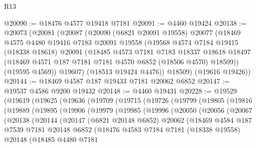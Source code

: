 \begin{lexlean}{R13}
\begin{coremodule}
@20090 := @18476 @4577 @19418 @7181
@20091 := @4460 @19424
@20138 := @20073
    (@20081
      (@20087
        (@20090
          (@6821 @20091 @19558)
          @20077
          (@18469
            @4575
            @4480
            @19416
            @7183
            @20091
            @19558
            (@19568
              @4574
              @7184
              @19415
              (@18338 @18618)
              @20091
              (@18485
                @4573
                @7181
                @7183
                @18337
                @18618
                @18497
                (@18469 @4571 @187 @7181 @7181 @4570 @6852 (@18506 @4570) @18509))
              (@19595 @4569))
            @19607)
          (@18513 @19424 @4476))
        @18509)
      (@19616 @19426))
@20144 := @18469 @4587 @187 @19433 @7181 @20062 @6852
@20147 := @19537 @4586 @9200 @19432
@20148 := @4460 @19431
@20228 := @19529
    (@19619
      (@19625
        (@19636
          (@19709
            (@19715
              (@19726
                (@19799
                  (@19805
                    (@19816
                      (@19889
                        (@19895
                          (@19906
                            (@19979
                              (@19985
                                (@19996
                                  (@20050
                                    (@20056
                                      (@20067
                                        (@20138
                                          (@20144
                                            (@20147
                                              (@6821 @20148 @6852)
                                              @20062
                                              (@18469
                                                @4584
                                                @187
                                                @7539
                                                @7181
                                                @20148
                                                @6852
                                                (@18476
                                                  @4583
                                                  @7184
                                                  @7181
                                                  (@18338 @19558)
                                                  @20148
                                                  (@18485
                                                    @4480
                                                    @7181

\end{coremodule}
\end{lexlean}
